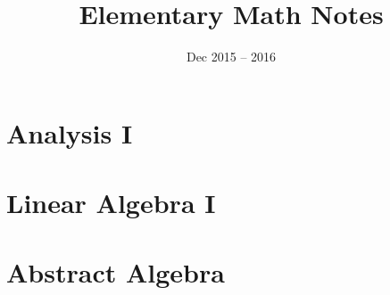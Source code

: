 \documentclass{article}
\title{Elementary Math Notes}
\date{Dec 2015 -- 2016}
\def\genpart#1#2{
  \part{#1}
  \parttoc
  \newpage
  
  \newpage}
\begin{document}
\doparttoc

\maketitle

\newpage
\setcounter{tocdepth}{1}
\tableofcontents
\newpage

\genpart{Analysis I}{analysis1}
\genpart{Linear Algebra I}{linear1}
\genpart{Abstract Algebra}{algebra2}

\printindex
\end{document}
